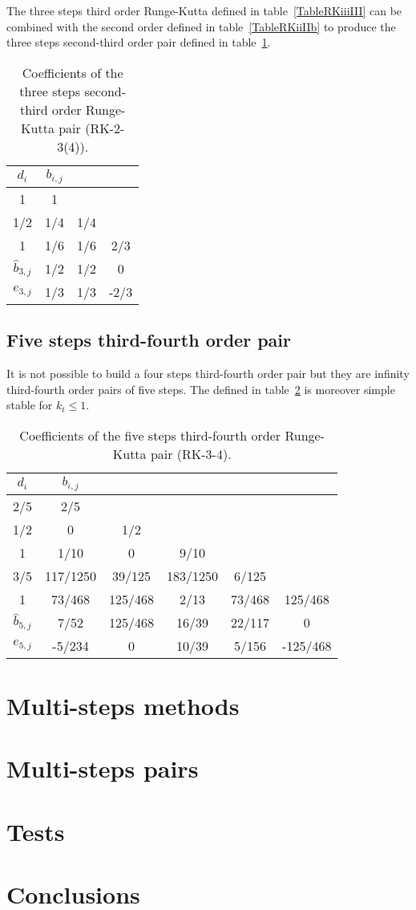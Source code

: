 \documentclass[a4paper]{article}
\begin{document}
The three steps third order Runge-Kutta defined in table~\ref{TableRKiiiIII}
can be combined with the second order defined in table~\ref{TableRKiiIIb} to
produce the three steps second-third order pair defined in
table~\ref{TableRKIIiiiIII}.
\begin{table}[ht]
	\centering
	\begin{tabular}{c|ccc}
		$d_{i}$ & $b_{i,j}$ \\ \hline
		1 & 1 \\
		1/2 & 1/4 & 1/4 \\
		1 & 1/6 & 1/6 & 2/3 \\ \hline
		$\hat{b}_{3,j}$ & 1/2 & 1/2 & 0 \\ \hline
		$e_{3,j}$ & 1/3 & 1/3 & -2/3
	\end{tabular}
	\caption{Coefficients of the three steps second-third order Runge-Kutta pair
		(RK-2-3(4)).\label{TableRKIIiiiIII}}
\end{table}

\subsection{Five steps third-fourth order pair}

It is not possible to build a four steps third-fourth order pair but they are
infinity third-fourth order pairs of five steps. The defined in
table~\ref{TableRKIIIvIV} is moreover simple stable for $k_t\leq1$.
\begin{table}[ht]
	\centering
	\begin{tabular}{c|ccccc}
		$d_{i}$ & $b_{i,j}$ \\ \hline
		2/5 & 2/5 \\
		1/2 & 0 & 1/2 \\
		1 & 1/10 & 0 & 9/10 \\
		3/5 & 117/1250 & 39/125 & 183/1250 & 6/125 \\
		1 & 73/468 & 125/468 & 2/13 & 73/468 & 125/468 \\ \hline
		$\hat{b}_{5,j}$ & 7/52 & 125/468 & 16/39 & 22/117 & 0 \\ \hline
		$e_{5,j}$ & -5/234 & 0 & 10/39 & 5/156 & -125/468
	\end{tabular}
	\caption{Coefficients of the five steps third-fourth order Runge-Kutta pair
		(RK-3-4).\label{TableRKIIIvIV}}
\end{table}

\section{Multi-steps methods}

\section{Multi-steps pairs}

\section{Tests}

\section{Conclusions}
\end{document}
